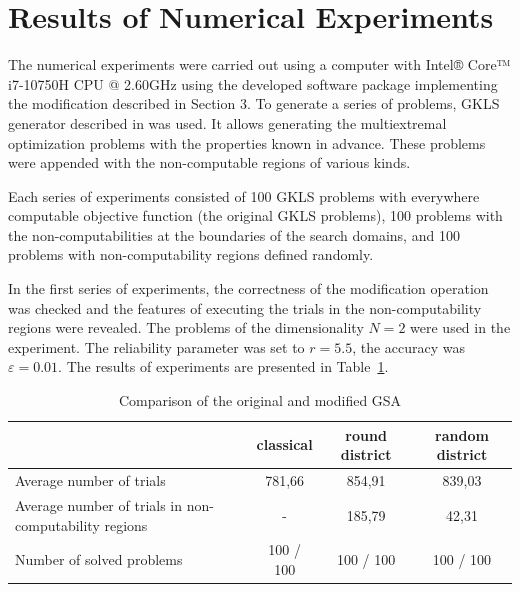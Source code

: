 \documentclass[runningheads]{llncs}
\begin{document}
\section{Results of Numerical Experiments}

The numerical experiments were carried out using a computer with Intel® Core™ i7-10750H CPU @ 2.60GHz using the developed software package implementing the modification described in Section 3. To generate a series of problems, GKLS generator described in \cite{Gaviano2003} was used. It allows generating the multiextremal optimization problems with the properties known in advance. These problems were appended with the non-computable regions of various kinds.

Each series of experiments consisted of 100 GKLS problems with everywhere computable objective function (the original GKLS problems), 100 problems with the non-computabilities at the boundaries of the search domains, and 100 problems with non-computability regions defined randomly.

In the first series of experiments, the correctness of the modification operation was checked and the features of executing the trials in the non-computability regions were revealed. The problems of the dimensionality $N=2$ were used in the experiment. The reliability parameter was set to $r=5.5$, the accuracy was $\varepsilon=0.01$. The results of experiments are presented in Table~\ref{tab1}.

\begin{table}[h]
\caption{Comparison of the original and modified GSA}\label{tab1}
\begin{tabular}{|l|c|c|c|}
\hline
 &  classical  &  round district  &  random district  \\
\hline
Average number of trials & 781,66	& 854,91 & 839,03 \\
Average number of trials in non-computability regions & - & 185,79 & 42,31 \\
Number of solved problems & 100 / 100 & 100 / 100 & 100 / 100\\
\hline
\end{tabular}
\end{table}
\end{document}
